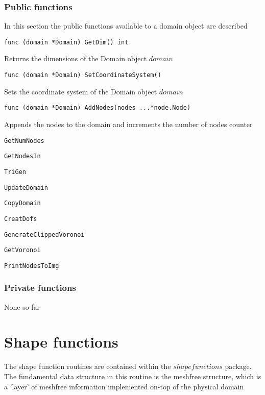 \subsubsection*{Public functions}
In this section the public functions available to a domain object are described
\begin{lstlisting}
func (domain *Domain) GetDim() int 
\end{lstlisting}
Returns the dimensions of the Domain object $domain$
\begin{lstlisting}
func (domain *Domain) SetCoordinateSystem() 
\end{lstlisting}
Sets the coordinate system of the Domain object $domain$
\begin{lstlisting}
func (domain *Domain) AddNodes(nodes ...*node.Node) 
\end{lstlisting}
Appends the nodes to the domain and increments the number of nodes counter
\begin{lstlisting}
GetNumNodes
\end{lstlisting}
\begin{lstlisting}
GetNodesIn
\end{lstlisting}
\begin{lstlisting}
TriGen
\end{lstlisting}
\begin{lstlisting}
UpdateDomain
\end{lstlisting}
\begin{lstlisting}
CopyDomain
\end{lstlisting}
\begin{lstlisting}
CreatDofs
\end{lstlisting}
\begin{lstlisting}
GenerateClippedVoronoi
\end{lstlisting}

\begin{lstlisting}
GetVoronoi
\end{lstlisting}

\begin{lstlisting}
PrintNodesToImg
\end{lstlisting}

\subsubsection*{Private functions}
None so far

\pagebreak
\section{Shape functions}
The shape function routines are contained within the $shapefunctions$ package. The fundamental data structure in this routine is the meshfree structure, which is a 'layer' of meshfree information implemented on-top of the physical domain

